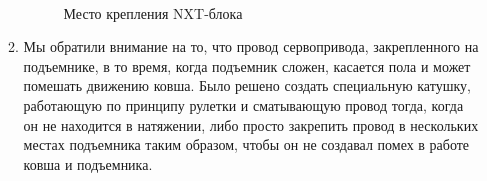 \begin{enumerate}
\begin{enumerate}
		\begin{figure}[H]
			\begin{minipage}[h]{0.2\linewidth}
				\center  
			\end{minipage}
			\begin{minipage}[h]{0.6\linewidth}
				\caption{Место крепления NXT-блока}
			\end{minipage}
		\end{figure}
		
		\item Мы обратили внимание на то, что провод сервопривода, закрепленного на подъемнике, в то время, когда подъемник сложен, касается пола и может помешать движению ковша. Было решено создать специальную катушку, работающую по принципу рулетки и сматывающую провод тогда, когда он не находится в натяжении, либо просто закрепить провод в нескольких местах подъемника таким образом, чтобы он не создавал помех в работе ковша и подъемника.\newline
		

\end{enumerate}
\end{enumerate}
